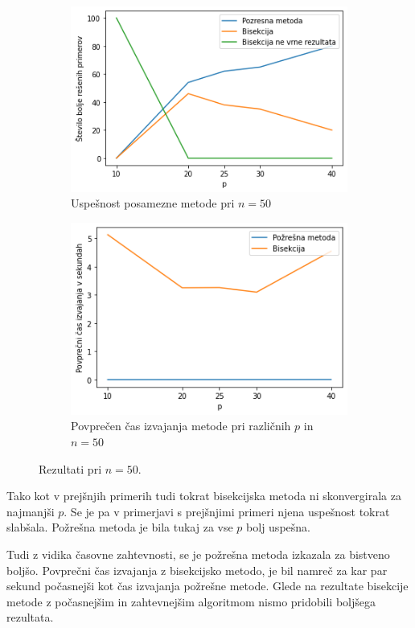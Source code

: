 \documentclass[a4paper]{article}
\begin{document}
\begin{figure}[h]
	\begin{subfigure}[t]{0.45\textwidth}
		\centering
		\includegraphics[width=\textwidth]{n_50.png}
		\caption{Uspešnost posamezne metode pri $n = 50$}
		\label{n_50_count}
	\end{subfigure}
	\hfill
	\begin{subfigure}[t]{0.45\textwidth}
		\centering
		\includegraphics[width=\textwidth]{n_50_time.png}
		\caption{Povprečen čas izvajanja metode pri različnih $p$ in $n = 50$}
		\label{n_50_time}
	\end{subfigure}
    \caption{Rezultati pri $n = 50$.}
    \label{fig:n_50}
\end{figure}

Tako kot v prejšnjih primerih tudi tokrat bisekcijska metoda ni skonvergirala za najmanjši $p$. Se je pa v primerjavi s prejšnjimi primeri njena uspešnost tokrat slabšala. Požrešna metoda je bila tukaj za vse $p$ bolj uspešna.

Tudi z vidika časovne zahtevnosti, se je požrešna metoda izkazala za bistveno boljšo. Povprečni čas izvajanja z bisekcijsko metodo, je bil namreč za kar par sekund počasnejši kot čas izvajanja požrešne metode. Glede na rezultate bisekcije metode z počasnejšim in zahtevnejšim algoritmom nismo pridobili boljšega rezultata. 
\end{document}
